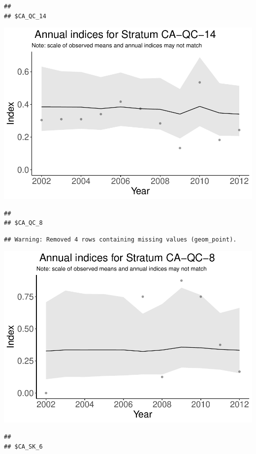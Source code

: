 \documentclass[]{article}
\begin{document}
\begin{verbatim}
## 
## $CA_QC_14
\end{verbatim}

\includegraphics{index_files/figure-latex/unnamed-chunk-7-13.pdf}

\begin{verbatim}
## 
## $CA_QC_8
\end{verbatim}

\begin{verbatim}
## Warning: Removed 4 rows containing missing values (geom_point).
\end{verbatim}

\includegraphics{index_files/figure-latex/unnamed-chunk-7-14.pdf}

\begin{verbatim}
## 
## $CA_SK_6
\end{verbatim}
\end{document}
